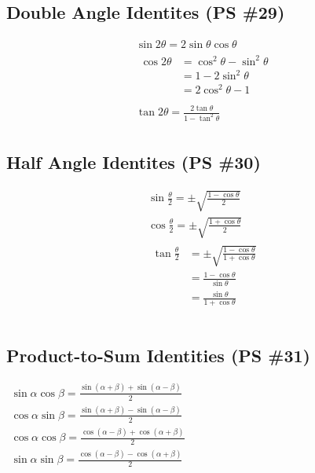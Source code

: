 \documentclass{article}
\begin{document}
\subsection{Double Angle Identites (PS \#29)}
\begin{gather*}
	\hyperref[proof:sindouble]{
		\sin2\theta=2\sin\theta\cos\theta
	} \\
	\hyperref[proof:cosdouble]{
		\begin{aligned}
			\cos2\theta&=\cos^2\theta-\sin^2\theta \\
			&=1-2\sin^2\theta \\
			&=2\cos^2\theta-1 \\
		\end{aligned}
	} \\
	\hyperref[proof:tandouble]{
		\tan2\theta=\frac{2\tan\theta}{1-\tan^2\theta}
	} \\
\end{gather*}

\subsection{Half Angle Identites (PS \#30)}
\begin{gather*}
	\hyperref[proof:sinhalf]{
		\sin\frac{\theta}{2}=\pm\sqrt{\frac{1-\cos\theta}{2}}
	} \\
	\hyperref[proof:coshalf]{
		\cos\frac{\theta}{2}=\pm\sqrt{\frac{1+\cos\theta}{2}}
	} \\
	\hyperref[proof:tandouble]{
		\begin{aligned}
		\tan\frac{\theta}{2}
		&=\pm\sqrt{\frac{1-\cos\theta}{1+\cos\theta}} \\
		&=\frac{1-\cos\theta}{\sin\theta} \\
		&=\frac{\sin\theta}{1+\cos\theta} \\
		\end{aligned}
	} \\
\end{gather*}

\subsection{Product-to-Sum Identities (PS \#31)}
\begin{center}
\hyperref[proof:p2s]{
	$\begin{aligned}
		\sin\alpha\cos\beta=\frac{\sin\left(\alpha+\beta\right)
			+\sin\left(\alpha-\beta\right)}{2} \\
		\cos\alpha\sin\beta=\frac{\sin\left(\alpha+\beta\right)
			-\sin\left(\alpha-\beta\right)}{2} \\
			\cos\alpha\cos\beta=\frac{\cos\left(\alpha-\beta\right)
				+\cos\left(\alpha+\beta\right)}{2} \\
		\sin\alpha\sin\beta=\frac{\cos\left(\alpha-\beta\right)
			-\cos\left(\alpha+\beta\right)}{2} \\
	\end{aligned}$
}
\end{center}
\end{document}
